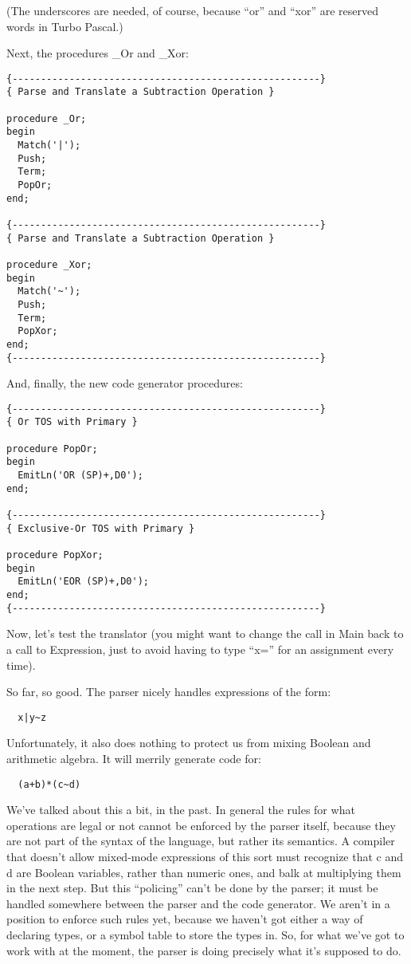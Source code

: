 (The underscores are needed, of course, because ``or'' and ``xor'' are reserved words in Turbo Pascal.)

Next, the procedures _Or and _Xor:

\begin{verbatim}
{------------------------------------------------------}
{ Parse and Translate a Subtraction Operation }

procedure _Or;
begin
  Match('|');
  Push;
  Term;
  PopOr;
end;

{------------------------------------------------------}
{ Parse and Translate a Subtraction Operation }

procedure _Xor;
begin
  Match('~');
  Push;
  Term;
  PopXor;
end;
{------------------------------------------------------}
\end{verbatim}

And, finally, the new code generator procedures:

\begin{verbatim}
{------------------------------------------------------}
{ Or TOS with Primary }

procedure PopOr;
begin
  EmitLn('OR (SP)+,D0');
end;

{------------------------------------------------------}
{ Exclusive-Or TOS with Primary }

procedure PopXor;
begin
  EmitLn('EOR (SP)+,D0');
end;
{------------------------------------------------------}
\end{verbatim}

Now, let's test the translator (you might want to change the call in Main back to a call to Expression, just to avoid having to type ``x='' for an assignment every time).

So far, so good. The parser nicely handles expressions of the form:

\begin{verbatim}
  x|y~z
\end{verbatim}

Unfortunately, it also does nothing to protect us from mixing Boolean and arithmetic algebra. It will merrily generate code for:

\begin{verbatim}
  (a+b)*(c~d)
\end{verbatim}

We've talked about this a bit, in the past. In general the rules for what operations are legal or not cannot be enforced by the parser itself, because they are not part of the syntax of the language, but rather its semantics. A compiler that doesn't allow mixed-mode expressions of this sort must recognize that c and d are Boolean variables, rather than numeric ones, and balk at multiplying them in the next step. But this ``policing'' can't be done by the parser; it must be handled somewhere between the parser and the code generator. We aren't in a position to enforce such rules yet, because we haven't got either a way of declaring types, or a symbol table to store the types in. So, for what we've got to work with at the moment, the parser is doing precisely what it's supposed to do.

